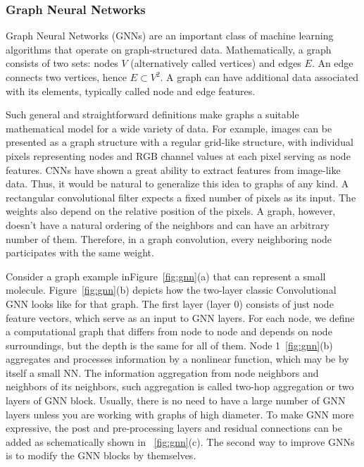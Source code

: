 \subsubsection{Graph Neural Networks}
\label{subsubsec:gnns}
Graph Neural Networks (GNNs)\cite{battagliaRelationalInductiveBiases2018, kipfSemiSupervisedClassificationGraph2017} are an important class of machine learning algorithms that operate on graph-structured data. Mathematically, a graph consists of two sets: nodes $V$ (alternatively called vertices) and edges $E$. An edge connects two vertices, hence $E\subset V^2$. A graph can have additional data associated with its elements, typically called node and edge features.

Such general and straightforward definitions make graphs a suitable mathematical model for a wide variety of data. For example, images can be presented as a graph structure with a regular grid-like structure, with individual pixels representing nodes and RGB channel values at each pixel serving as node features. CNNs have shown a great ability to extract features from image-like data. Thus, it would be natural to generalize this idea to graphs of any kind. A rectangular convolutional filter expects a fixed number of pixels as its input. The weights also depend on the relative position of the pixels. A graph, however, doesn't have a natural ordering of the neighbors and can have an arbitrary number of them. Therefore, in a graph convolution, every neighboring node participates with the same weight.

Consider a graph example inFigure~\ref{fig:gnn}(a) that can represent a small molecule. Figure~\ref{fig:gnn}(b) depicts how the two-layer classic Convolutional GNN looks like for that graph. The first layer (layer 0) consists of just node feature vectors, which serve as an input to GNN layers. For each node, we define a computational graph that differs from node to node and depends on node surroundings, but the depth is the same for all of them. Node 1~\ref{fig:gnn}(b) aggregates and processes information by a nonlinear function, which may be by itself a small NN. The information aggregation from node neighbors and neighbors of its neighbors, such aggregation is called two-hop aggregation or two layers of GNN block. Usually, there is no need to have a large number of GNN layers unless you are working with graphs of high diameter. To make GNN more expressive, the post and pre-processing layers and residual connections can be added as schematically shown in ~\ref{fig:gnn}(c). The second way to improve GNNs is to modify the GNN blocks by themselves.

